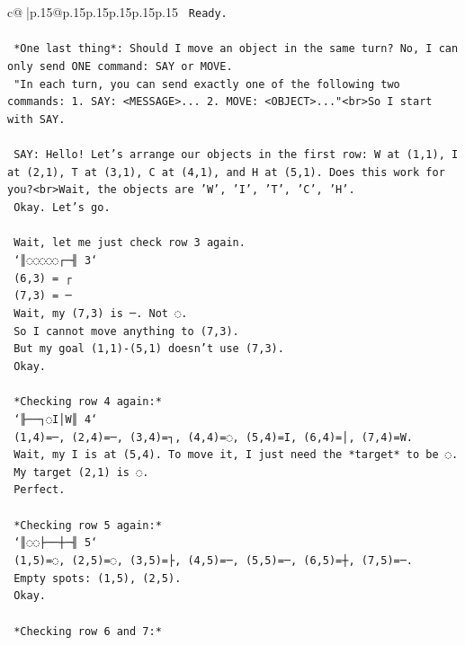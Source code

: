 \documentclass{article}
\begin{document}
{\begin{supertabular}{c@{$\;$}|p{.15\linewidth}@{}p{.15\linewidth}p{.15\linewidth}p{.15\linewidth}p{.15\linewidth}p{.15\linewidth}}
{{{\texttt{    Ready.} \\
\\ 
\texttt{    *One last thing*: Should I move an object in the same turn? No, I can only send ONE command: SAY or MOVE.} \\
\texttt{    "In each turn, you can send exactly one of the following two commands: 1. SAY: <MESSAGE>... 2. MOVE: <OBJECT>..."<br>So I start with SAY.} \\
\\ 
\texttt{    SAY: Hello! Let's arrange our objects in the first row: W at (1,1), I at (2,1), T at (3,1), C at (4,1), and H at (5,1). Does this work for you?<br>Wait, the objects are 'W', 'I', 'T', 'C', 'H'.} \\
\texttt{    Okay. Let's go.} \\
\\ 
\texttt{    Wait, let me just check row 3 again.} \\
\texttt{    `║◌◌◌◌◌┌─╢ 3`} \\
\texttt{    (6,3) = ┌} \\
\texttt{    (7,3) = ─} \\
\texttt{    Wait, my (7,3) is ─. Not ◌.} \\
\texttt{    So I cannot move anything to (7,3).} \\
\texttt{    But my goal (1,1){-}(5,1) doesn't use (7,3).} \\
\texttt{    Okay.} \\
\\ 
\texttt{    *Checking row 4 again:*} \\
\texttt{    `╟──┐◌I│W║ 4`} \\
\texttt{    (1,4)=─, (2,4)=─, (3,4)=┐, (4,4)=◌, (5,4)=I, (6,4)=│, (7,4)=W.} \\
\texttt{    Wait, my I is at (5,4). To move it, I just need the *target* to be ◌.} \\
\texttt{    My target (2,1) is ◌.} \\
\texttt{    Perfect.} \\
\\ 
\texttt{    *Checking row 5 again:*} \\
\texttt{    `║◌◌├──┼─╢ 5`} \\
\texttt{    (1,5)=◌, (2,5)=◌, (3,5)=├, (4,5)=─, (5,5)=─, (6,5)=┼, (7,5)=─.} \\
\texttt{    Empty spots: (1,5), (2,5).} \\
\texttt{    Okay.} \\
\\ 
\texttt{    *Checking row 6 and 7:*} \\
}}}
\end{supertabular}}
\end{document}
